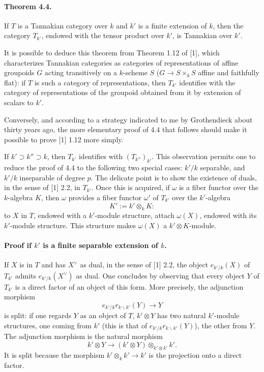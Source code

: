 \documentclass[11pt]{article}
\theoremstyle{plain}
\theoremstyle{definition}
\begin{document}
\paragraph{Theorem 4.4.} If $T$ is a Tannakian category over $k$ and $k'$ is a finite extension of $k$, then the category $T_{k'}$, endowed with the tensor product over $k'$, is Tannakian over $k'$.

It is possible to deduce this theorem from Theorem 1.12 of [1], which characterizes Tannakian categories as categories of representations of affine groupoids $G$ acting transitively on a $k$-scheme $S$ ($G\to S\times_kS$ affine and faithfully flat): if $T$ is such a category of representations, then $T_{k'}$ identifies with the category of representations of the groupoid obtained from it by extension of scalars to $k'$.

Conversely, and according to a strategy indicated to me by Grothendieck about thirty years ago, the more elementary proof of 4.4 that follows should make it possible to prove [1] 1.12 more simply.

If $k'\supset k''\supset k$, then $T_{k'}$ identifies with $(T_{k''})_{k'}$. This observation permits one to reduce the proof of 4.4 to the following two special cases: $k'/k$ separable, and $k'/k$ inseparable of degree $p$. The delicate point is to show the existence of duals, in the sense of [1] 2.2, in $T_{k'}$. Once this is acquired, if $\omega$ is a fiber functor over the $k$-algebra $K$, then $\omega$ provides a fiber functor $\omega'$ of $T_{k'}$ over the $k'$-algebra
\[
   K':=k'\otimes_kK:
\]
to $X$ in $T$, endowed with a $k'$-module structure, attach $\omega(X)$, endowed with its $k'$-module structure. This structure makes $\omega(X)$ a $k'\otimes K$-module.

\paragraph{Proof if $k'$ is a finite separable extension of $k$.} If $X$ is in $T$ and has $X^\vee$ as dual, in the sense of [1] 2.2, the object $e_{k'/k}(X)$ of $T_{k'}$ admits $e_{k'/k}(X^\vee)$ as dual. One concludes by observing that every object $Y$ of $T_{k'}$ is a direct factor of an object of this form. More precisely, the adjunction morphism
\[
   e_{k'/k}r_{k\backslash k'}(Y)\longrightarrow Y
\]
is split: if one regards $Y$ as an object of $T$, $k'\otimes Y$ has two natural $k'$-module structures, one coming from $k'$ (this is that of $e_{k'/k}r_{k\backslash k'}(Y)$), the other from $Y$. The adjunction morphism is the natural morphism
\[
   k'\otimes Y\longrightarrow (k'\otimes Y)\otimes_{k'\otimes k'}k'.
\]
It is split because the morphism $k'\otimes_k k'\to k'$ is the projection onto a direct factor.
\end{document}
